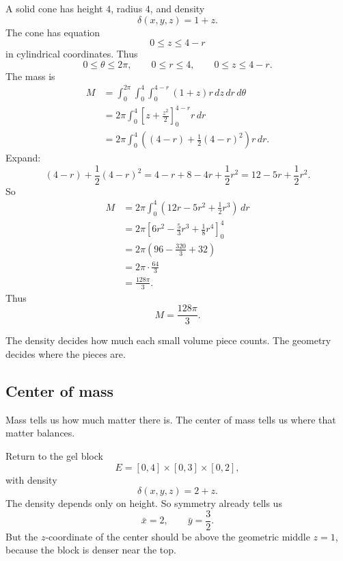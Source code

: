\begin{example}
A solid cone has height \(4\), radius \(4\), and density
\[
    \delta(x,y,z)=1+z.
\]
The cone has equation
\[
    0\le z\le 4-r
\]
in cylindrical coordinates.  Thus
\[
    0\le \theta\le 2\pi,
    \qquad
    0\le r\le4,
    \qquad
    0\le z\le4-r.
\]
The mass is
\[
\begin{aligned}
M
&=
\int_0^{2\pi}\int_0^4\int_0^{4-r}
(1+z)r\,dz\,dr\,d\theta\\
&=
2\pi\int_0^4
\left[z+\frac{z^2}{2}\right]_0^{4-r}
r\,dr\\
&=
2\pi\int_0^4
\left((4-r)+\frac12(4-r)^2\right)r\,dr.
\end{aligned}
\]
Expand:
\[
    (4-r)+\frac12(4-r)^2
    =
    4-r+8-4r+\frac12r^2
    =
    12-5r+\frac12r^2.
\]
So
\[
\begin{aligned}
M
&=
2\pi\int_0^4
\left(12r-5r^2+\frac12r^3\right)\,dr\\
&=
2\pi
\left[
6r^2-\frac53r^3+\frac18r^4
\right]_0^4\\
&=
2\pi
\left(
96-\frac{320}{3}+32
\right)\\
&=
2\pi\cdot\frac{64}{3}\\
&=
\frac{128\pi}{3}.
\end{aligned}
\]
Thus
\[
\boxed{
    M=\frac{128\pi}{3}.
}
\]
\end{example}

The density decides how much each small volume piece counts.  The geometry decides
where the pieces are.

\subsection{Center of mass}

Mass tells us how much matter there is.  The center of mass tells us where that matter
balances.

Return to the gel block
\[
    E=[0,4]\times[0,3]\times[0,2],
\]
with density
\[
    \delta(x,y,z)=2+z.
\]
The density depends only on height.  So symmetry already tells us
\[
    \bar x=2,
    \qquad
    \bar y=\frac32.
\]
But the \(z\)-coordinate of the center should be above the geometric middle \(z=1\),
because the block is denser near the top.

